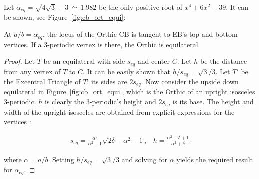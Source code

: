     
Let $\alpha_{eq}=\sqrt{4 \sqrt{3}-3}\,{\simeq}\,1.982$ be the only positive root of $x^4 + 6 x^2 - 39$. It can be shown, see Figure~\ref{fig:cb_ort_equi}:

\begin{proposition}
At $a/b=\alpha_{eq}$, the locus of the Orthic CB is tangent to EB's top and bottom vertices. If a 3-periodic vertex is there, the Orthic is equilateral.
\end{proposition}

\begin{proof}
Let $T$ be an equilateral with side $s_{eq}$ and center $C$. Let $h$ be the distance from any vertex of $T$ to $C$. It can be easily shown that $h/s_{eq}=\sqrt{3}/3$. Let $T'$ be the Excentral Triangle of $T$: its sides are $2s_{eq}$. Now consider the upside down equilateral in Figure~\ref{fig:cb_ort_equi}, which is the Orthic of an upright isosceles 3-periodic. $h$ is clearly the 3-periodic's height and $2s_{eq}$ is its base. The height and width of the upright isosceles are obtained from explicit expressions for the vertices \cite{garcia2019-incenter}:

\begin{align*}
    s_{eq}=\frac{\alpha^2}{\alpha^2-1}\sqrt{2\delta-\alpha^2-1},\;\;\;h=\frac{\alpha^2+\delta+1}{\alpha^2+\delta}
\end{align*}

\noindent where $\alpha=a/b$. Setting $h/s_{eq}=\sqrt{3}/3$ and solving for $\alpha$ yields the required result for $\alpha_{eq}$.
\end{proof}


